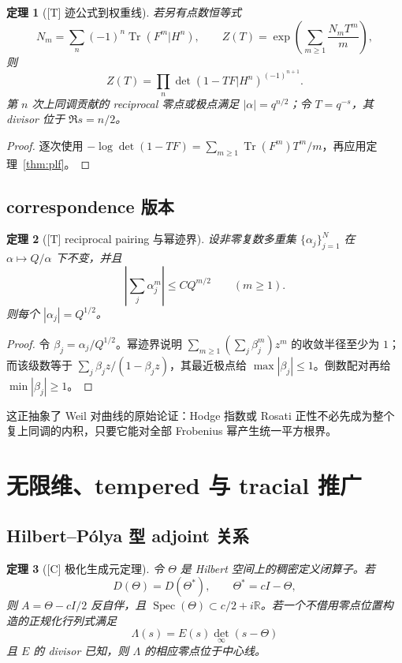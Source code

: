 \documentclass[UTF8,11pt,a4paper]{ctexart}
\newtheorem{theorem}{定理}[section]
\theoremstyle{definition}
\theoremstyle{remark}
\newcommand{\R}{\mathbb R}
\newcommand{\Tr}{\operatorname{Tr}}
\newcommand{\Spec}{\operatorname{Spec}}
\newcommand{\1}{\mathbf 1}
\newcommand{\statusT}{\textnormal{[T]}}
\newcommand{\statusC}{\textnormal{[C]}}
\begin{document}
\begin{theorem}[\statusT{} 迹公式到权重线]
若另有点数恒等式
\[
  N_m=\sum_n(-1)^n\Tr(F^m|H^n),\qquad
  Z(T)=\exp\!\left(\sum_{m\geq1}\frac{N_mT^m}{m}\right),
\]
则
\[
  Z(T)=\prod_n\det(1-TF|H^n)^{(-1)^{n+1}}.
\]
第 $n$ 次上同调贡献的 reciprocal 零点或极点满足 $|\alpha|=q^{n/2}$；令 $T=q^{-s}$，其 divisor 位于 $\Re s=n/2$。
\end{theorem}

\begin{proof}
逐次使用 $-\log\det(1-TF)=\sum_{m\geq1}\Tr(F^m)T^m/m$，再应用定理~\ref{thm:plf}。
\end{proof}

\subsection{correspondence 版本}

\begin{theorem}[\statusT{} reciprocal pairing 与幂迹界]
设非零复数多重集 $\{\alpha_j\}_{j=1}^N$ 在 $\alpha\mapsto Q/\alpha$ 下不变，并且
\[
  \left|\sum_j\alpha_j^m\right|\leq C Q^{m/2}\qquad(m\geq1).
\]
则每个 $|\alpha_j|=Q^{1/2}$。
\end{theorem}

\begin{proof}
令 $\beta_j=\alpha_j/Q^{1/2}$。幂迹界说明 $\sum_{m\geq1}(\sum_j\beta_j^m)z^m$ 的收敛半径至少为 $1$；而该级数等于 $\sum_j\beta_jz/(1-\beta_jz)$，其最近极点给 $\max|\beta_j|\leq1$。倒数配对再给 $\min|\beta_j|\geq1$。
\end{proof}

这正抽象了 Weil 对曲线的原始论证：Hodge 指数或 Rosati 正性不必先成为整个复上同调的内积，只要它能对全部 Frobenius 幂产生统一平方根界。

\section{无限维、tempered 与 tracial 推广}

\subsection{Hilbert--Pólya 型 adjoint 关系}

\begin{theorem}[\statusC{} 极化生成元定理]\label{thm:adjoint}
令 $\Theta$ 是 Hilbert 空间上的稠密定义闭算子。若
\[
  D(\Theta)=D(\Theta^*),\qquad \Theta^*=cI-\Theta,
\]
则 $A=\Theta-cI/2$ 反自伴，且 $\Spec(\Theta)\subset c/2+i\R$。若一个不借用零点位置构造的正规化行列式满足
\[
  \Lambda(s)=E(s)\det_\infty(s-\Theta)
\]
且 $E$ 的 divisor 已知，则 $\Lambda$ 的相应零点位于中心线。
\end{theorem}
\end{document}
